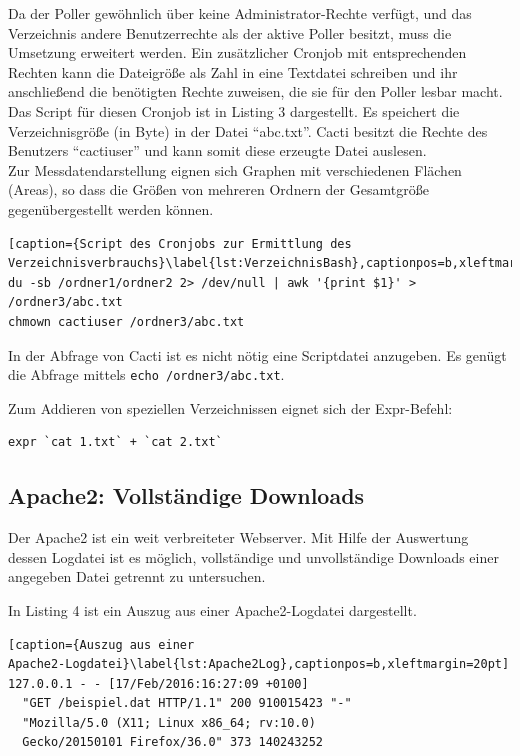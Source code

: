 \documentclass[12pt,ngerman,toc=listofnumbered,toc=bibliographynumbered,toc=index,headsepline=true]{scrbook}
\begin{document}
Da der Poller gewöhnlich über keine Administrator-Rechte verfügt, und das
Verzeichnis andere Benutzerrechte als der aktive Poller besitzt, muss die
Umsetzung erweitert werden. Ein zusätzlicher Cronjob mit entsprechenden Rechten
kann die Dateigröße als Zahl in eine Textdatei schreiben und ihr anschließend
die benötigten Rechte zuweisen, die sie für den Poller lesbar macht. Das Script
für diesen Cronjob ist in Listing 3 dargestellt. Es
speichert die Verzeichnisgröße (in Byte) in der Datei \enquote{abc.txt}. Cacti
besitzt die Rechte des Benutzers \enquote{cactiuser} und kann somit diese
erzeugte Datei auslesen.\\
Zur Messdatendarstellung eignen sich Graphen mit verschiedenen Flächen (Areas),
so dass die Größen von mehreren Ordnern der Gesamtgröße gegenübergestellt werden
können.

\begin{lstlisting}[caption={Script des Cronjobs zur Ermittlung des
Verzeichnisverbrauchs}\label{lst:VerzeichnisBash},captionpos=b,xleftmargin=20pt]
du -sb /ordner1/ordner2 2> /dev/null | awk '{print $1}' >  /ordner3/abc.txt
chmown cactiuser /ordner3/abc.txt
\end{lstlisting}

In der Abfrage von Cacti ist es nicht nötig eine Scriptdatei anzugeben. Es
genügt die Abfrage mittels \texttt{echo /ordner3/abc.txt}. 

Zum Addieren von speziellen Verzeichnissen eignet sich der Expr-Befehl:
\begin{lstlisting}[xleftmargin=20pt]
expr `cat 1.txt` + `cat 2.txt`
\end{lstlisting}

\subsection{Apache2: Vollständige Downloads}
\label{subsubsec:Apache2}
Der Apache2 ist ein weit verbreiteter Webserver. Mit Hilfe der Auswertung dessen
Logdatei ist es möglich, vollständige und unvollständige Downloads einer
angegeben Datei getrennt zu untersuchen.

In Listing 4 ist ein Auszug aus einer Apache2-Logdatei
dargestellt.

\begin{lstlisting}[caption={Auszug aus einer
Apache2-Logdatei}\label{lst:Apache2Log},captionpos=b,xleftmargin=20pt]
127.0.0.1 - - [17/Feb/2016:16:27:09 +0100]
  "GET /beispiel.dat HTTP/1.1" 200 910015423 "-"
  "Mozilla/5.0 (X11; Linux x86_64; rv:10.0)
  Gecko/20150101 Firefox/36.0" 373 140243252
\end{lstlisting}
\end{document}
